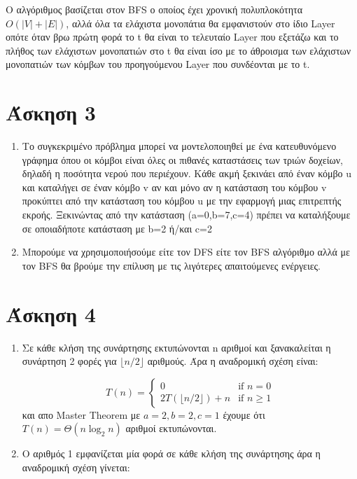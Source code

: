 \documentclass[a4paper,10pt]{article}
\begin{document}
\begin{flushleft}
    Ο αλγόριθμος βασίζεται στον BFS ο οποίος έχει χρονική πολυπλοκότητα $O(|V| + |E|)$, αλλά όλα τα ελάχιστα μονοπάτια θα εμφανιστούν στο ίδιο Layer οπότε όταν βρω πρώτη φορά το t θα είναι το τελευταίο Layer που εξετάζω και το πλήθος των ελάχιστων μονοπατιών στο t θα είναι ίσο με το άθροισμα των ελάχιστων μονοπατιών των κόμβων του προηγούμενου Layer που συνδέονται με το t.

    \newpage
    \section*{Άσκηση 3}
    \begin{enumerate}
        \item Το συγκεκριμένο πρόβλημα μπορεί να μοντελοποιηθεί με ένα κατευθυνόμενο γράφημα όπου οι κόμβοι είναι όλες οι πιθανές καταστάσεις των τριών δοχείων, δηλαδή η ποσότητα νερού που περιέχουν. Κάθε ακμή ξεκινάει από έναν κόμβο u και καταλήγει σε έναν κόμβο v αν και μόνο αν η κατάσταση του κόμβου v προκύπτει από την κατάσταση του κόμβου u με την εφαρμογή μιας επιτρεπτής εκροής.\newline
        Ξεκινώντας από την κατάσταση (a=0,b=7,c=4) πρέπει να καταλήξουμε σε οποιαδήποτε κατάσταση με b=2 ή/και c=2
        \item Μπορούμε να χρησιμοποιήσούμε είτε τον DFS είτε τον BFS αλγόριθμο αλλά με τον BFS θα βρούμε την επίλυση με τις λιγότερες απαιτούμενες ενέργειες.
    \end{enumerate}

    \newpage
    \section*{Άσκηση 4}
    \begin{enumerate}
        \item Σε κάθε κλήση της συνάρτησης εκτυπώνονται n αριθμοί και ξανακαλείται η συνάρτηση 2 φορές για $\lfloor n/2 \rfloor$ αριθμούς. Άρα η αναδρομική σχέση είναι: 

        \begin{equation*}
            T(n) = 
            \begin{cases}
            0 & \text{if } n = 0 \\
            2T(\lfloor n/2 \rfloor) + n & \text{if } n \geq 1
            \end{cases}
        \end{equation*}
        και απο Master Theorem με $a=2, b=2, c=1$ έχουμε ότι $T(n) = \Theta(n\log_2{n})$ αριθμοί εκτυπώνονται.
        \item Ο αριθμός 1 εμφανίζεται μία φορά σε κάθε κλήση της συνάρτησης άρα η αναδρομική σχέση γίνεται:
        

\end{enumerate}
\end{flushleft}
\end{document}
